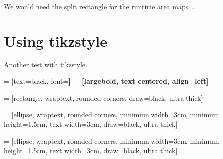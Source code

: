 We would need the split rectangle for the runtime area maps....


\section{Using tikzstyle}

Another test with tikzstyle.


 = [text=black, font=\bfseries\large]
 = [largebold, text centered, align=left]

 = [rectangle,
                                wraptext,
                                rounded corners,
                                draw=black,
                                ultra thick]

 = [ellipse,
                         wraptext,
                         rounded corners,
                         minimum width=3cm,
                         minimum height=1.5cm,
                         text width=3cm,
                         draw=black,
                         ultra thick]

 = [ellipse,
                         wraptext,
                         rounded corners,
                         minimum width=3cm,
                         minimum height=1.5cm,
                         text width=3cm,
                         draw=black,
                         ultra thick]


